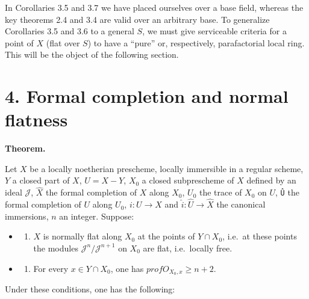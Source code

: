 \documentclass[
  11pt,
  a4paper,
]{book}
\providecommand{\tightlist}{%
  \setlength{\itemsep}{0pt}\setlength{\parskip}{0pt}}
\begin{document}
In Corollaries 3.5 and 3.7 we have placed ourselves over a base field,
whereas the key theorems 2.4 and 3.4 are valid over an arbitrary base.
To generalize Corollaries 3.5 and 3.6 to a general \(S\), we must give
serviceable criteria for a point of \(X\) (flat over \(S\)) to have a
``pure'' or, respectively, parafactorial local ring. This will be the
object of the following section.

\section{4. Formal completion and normal
flatness}\label{formal-completion-and-normal-flatness}

\textbf{Theorem.}

Let \(X\) be a locally noetherian prescheme, locally immersible in a
regular scheme, \(Y\) a closed part of \(X\), \(U = X -
Y\), \(X_{0}\) a closed subprescheme of \(X\) defined by an ideal
\(\mathcal{J}\), \(\hat{X}\) the formal completion of \(X\) along
\(X_{0}\), \(U_{0}\) the trace of \(X_{0}\) on \(U\), \texttt{Û} the
formal completion of \(U\) along \(U_{0}\), \(i: U \to X\) and
\(\hat{i}:
\hat{U} \to \hat{X}\) the canonical immersions, \(n\) an integer.
Suppose:

\begin{itemize}
\tightlist
\item
  \begin{enumerate}
  \def\labelenumi{\alph{enumi})}
  \tightlist
  \item
    \(X\) is normally flat along \(X_{0}\) at the points of
    \(Y \cap X_{0}\), i.e.~at these points the modules
    \(\mathcal{J}^{n}/\mathcal{J}^{n+1}\) on \(X_{0}\) are flat,
    i.e.~locally free.
  \end{enumerate}
\item
  \begin{enumerate}
  \def\labelenumi{\alph{enumi})}
  \setcounter{enumi}{1}
  \tightlist
  \item
    For every \(x \in Y \cap X_{0}\), one has
    \(prof O_{X_{0},x} \geqslant n + 2\).
  \end{enumerate}
\end{itemize}

Under these conditions, one has the following:
\end{document}
